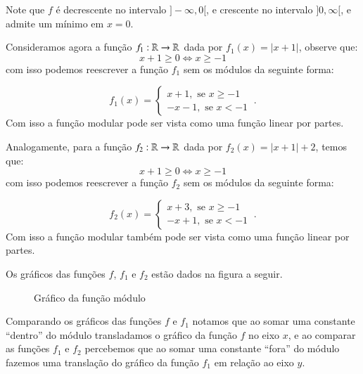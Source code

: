   Note que $f$ é decrescente no intervalo $]-\infty, 0[$, e crescente no intervalo $]0, \infty[$, e admite um mínimo em $x=0$.

  Consideramos agora a função $f_1: \mathbb{R} \rightarrow \mathbb{R}$ dada por $f_1(x)= |x+1|$, observe que:
  \[x+1 \geq 0 \Leftrightarrow  x \geq -1\]
  com isso podemos reescrever a função $f_1$ sem os módulos da seguinte forma:

  \[f_1(x)= \begin{cases}
                 x + 1, \text{ se } x \geq -1 \\
                 -x - 1, \text{ se } x < -1
                \end{cases} \ .\]
  Com isso a função modular pode ser vista como uma função linear por partes.

  Analogamente, para a função $f_2: \mathbb{R} \rightarrow \mathbb{R}$ dada por $f_2(x)= |x+1|+2$, temos que:
  \[x+1 \geq 0 \Leftrightarrow  x \geq -1\]
  com isso podemos reescrever a função $f_2$ sem os módulos da seguinte forma:

  \[f_2(x)= \begin{cases}
                 x + 3, \text{ se } x \geq -1 \\
                 -x + 1, \text{ se } x < -1
                \end{cases} \ .\]
  Com isso a função modular também pode ser vista como uma função linear por partes.

  Os gráficos das funções $f$, $f_1$ e $f_2$ estão dados na figura a seguir.

  \begin{figure}[H]
 \centering
    \caption{Gráfico da função módulo}
  \end{figure}

  Comparando os gráficos das funções $f$ e $f_1$ notamos que ao somar uma constante ``dentro'' do módulo transladamos o gráfico da função $f$ no eixo $x$, e ao comparar as funções $f_1$ e $f_2$ percebemos que ao somar uma constante ``fora'' do módulo fazemos uma translação do gráfico da função $f_1$ em relação ao eixo $y$.

